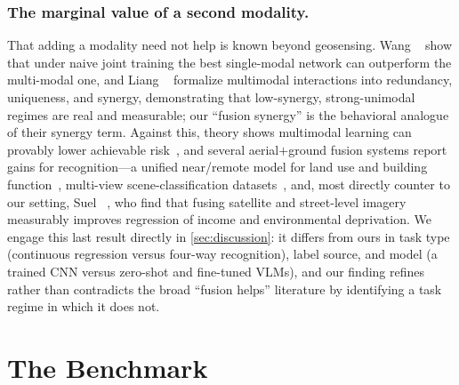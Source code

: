 \documentclass[runningheads]{llncs}
\begin{document}
\subsubsection{The marginal value of a second modality.}
That adding a modality need not help is known beyond geosensing. Wang
\etal~\cite{wang2020multimodal} show that under naive joint training the best
single-modal network can outperform the multi-modal one, and Liang
\etal~\cite{liang2023quantifying} formalize multimodal interactions into
redundancy, uniqueness, and synergy, demonstrating that low-synergy,
strong-unimodal regimes are real and measurable; our ``fusion synergy'' is the
behavioral analogue of their synergy term. Against this, theory shows multimodal
learning can provably lower achievable risk~\cite{huang2021makes}, and several
aerial$+$ground fusion systems report gains for recognition---a unified near/remote
model for land use and building function~\cite{workman2017unified}, multi-view
scene-classification datasets~\cite{machado2021airound}, and, most directly
counter to our setting, Suel \etal~\cite{suel2021multimodal}, who find that fusing
satellite and street-level imagery measurably improves regression of income and
environmental deprivation. We engage this last result directly in
\cref{sec:discussion}: it differs from ours in task type (continuous regression
versus four-way recognition), label source, and model (a trained CNN versus
zero-shot and fine-tuned VLMs), and our finding refines rather than contradicts
the broad ``fusion helps'' literature by identifying a task regime in which it
does not.

\section{The Benchmark}
\label{sec:dataset}
\end{document}
